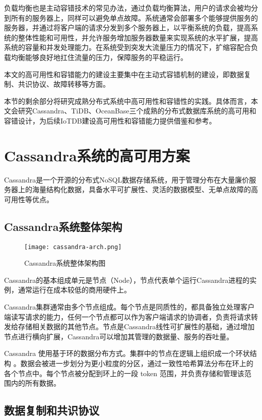负载均衡也是主动容错技术的常见办法，通过负载均衡算法，用户的请求会被均分到所有的服务器上，同样可以避免单点故障。系统通常会部署多个能够提供服务的服务器，并通过将客户端的请求分发到多个服务器上，以平衡系统的负载，提高系统的整体性能和可用性，并允许服务增加服务器数量来实现系统的水平扩展，提高系统的容量和并发处理能力。在系统受到突发大流量压力的情况下，扩缩容配合负载均衡能够良好地扛住流量的压力，保障服务的平稳运行。

本文的高可用性和容错能力的建设主要集中在主动式容错机制的建设，即数据复制、共识协议、故障转移等方面。

本节的剩余部分将研究成熟分布式系统中高可用性和容错性的实践。具体而言，本文会研究Cassandra、TiDB、OceanBase三个成熟的分布式数据库系统的高可用和容错设计，为后续IoTDB建设高可用性和容错能力提供借鉴和参考。



\section{Cassandra系统的高可用方案}
Cassandra\cite{lakshman2010cassandra}是一个开源的分布式NoSQL数据存储系统，用于管理分布在大量廉价服务器上的海量结构化数据，具备水平可扩展性、灵活的数据模型、无单点故障的高可用性等优点。

\subsection{Cassandra系统整体架构}

\begin{figure}
  \centering
  \texttt{[image: cassandra-arch.png]}
  \caption{Cassandra系统整体架构图}
  \label{fig:cassandra-arch}
\end{figure}

Cassandra的基本组成单元是节点（Node），节点代表单个运行Cassandra进程的实例，通常运行在成本较低的商用硬件上。

Cassandra集群通常由多个节点组成。每个节点是同质性的，都具备独立处理客户端读写请求的能力，任何一个节点都可以作为客户端请求的协调者，负责将请求转发给存储相关数据的其他节点。节点是Cassandra线性可扩展性的基础，通过增加节点进行横向扩展，Cassandra可以增加其管理的数据量、服务的吞吐量。

Cassandra 使用基于环的数据分布方式。集群中的节点在逻辑上组织成一个环状结构 。数据会被进一步划分为更小粒度的分区，通过一致性哈希算法\cite{karger1997consistent}分布在环上的各个节点中。每个节点被分配到环上的一段 token 范围，并负责存储和管理该范围内的所有数据。

\subsection{数据复制和共识协议}



